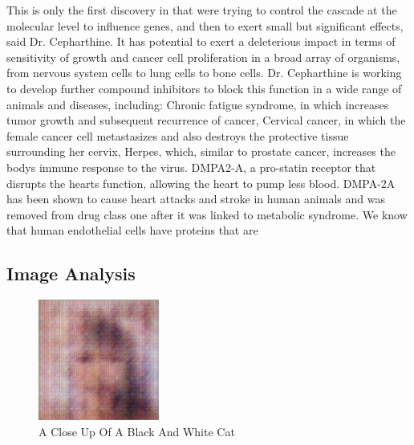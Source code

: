 \documentclass{article}%
\begin{document}
This is only the first discovery in that were trying to control the cascade at the molecular level to influence genes, and then to exert small but significant effects, said Dr. Cepharthine. It has potential to exert a deleterious impact in terms of sensitivity of growth and cancer cell proliferation in a broad array of organisms, from nervous system cells to lung cells to bone cells.\newline%
Dr. Cepharthine is working to develop further compound inhibitors to block this function in a wide range of animals and diseases, including:\newline%
 Chronic fatigue syndrome, in which increases tumor growth and subsequent recurrence of cancer,\newline%
 Cervical cancer, in which the female cancer cell metastasizes and also destroys the protective tissue surrounding her cervix,\newline%
 Herpes, which, similar to prostate cancer, increases the bodys immune response to the virus.\newline%
 DMPA2{-}A, a pro{-}statin receptor that disrupts the hearts function, allowing the heart to pump less blood.\newline%
 DMPA{-}2A has been shown to cause heart attacks and stroke in human animals and was removed from drug class one after it was linked to metabolic syndrome.\newline%
We know that human endothelial cells have proteins that are

%
\subsection{Image Analysis}%
\label{subsec:ImageAnalysis}%


\begin{figure}[h!]%
\centering%
\includegraphics[width=150px]{500_fake_images/samples_5_379.png}%
\caption{A Close Up Of A Black And White Cat}%
\end{figure}

%
\end{document}

